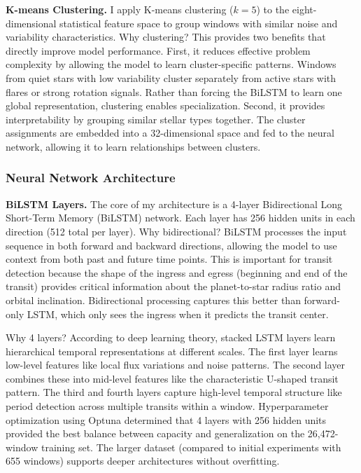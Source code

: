 \documentclass[letterpaper]{article} %
\begin{document}
\textbf{K-means Clustering.} I apply K-means clustering ($k=5$) to the eight-dimensional statistical feature space to group windows with similar noise and variability characteristics. Why clustering? This provides two benefits that directly improve model performance. First, it reduces effective problem complexity by allowing the model to learn cluster-specific patterns. Windows from quiet stars with low variability cluster separately from active stars with flares or strong rotation signals. Rather than forcing the BiLSTM to learn one global representation, clustering enables specialization. Second, it provides interpretability by grouping similar stellar types together. The cluster assignments are embedded into a 32-dimensional space and fed to the neural network, allowing it to learn relationships between clusters.

\subsubsection{Neural Network Architecture}
\textbf{BiLSTM Layers.} The core of my architecture is a 4-layer Bidirectional Long Short-Term Memory (BiLSTM) network. Each layer has 256 hidden units in each direction (512 total per layer). Why bidirectional? BiLSTM processes the input sequence in both forward and backward directions, allowing the model to use context from both past and future time points. This is important for transit detection because the shape of the ingress and egress (beginning and end of the transit) provides critical information about the planet-to-star radius ratio and orbital inclination. Bidirectional processing captures this better than forward-only LSTM, which only sees the ingress when it predicts the transit center.

Why 4 layers? According to deep learning theory, stacked LSTM layers learn hierarchical temporal representations at different scales. The first layer learns low-level features like local flux variations and noise patterns. The second layer combines these into mid-level features like the characteristic U-shaped transit pattern. The third and fourth layers capture high-level temporal structure like period detection across multiple transits within a window. Hyperparameter optimization using Optuna determined that 4 layers with 256 hidden units provided the best balance between capacity and generalization on the 26,472-window training set. The larger dataset (compared to initial experiments with 655 windows) supports deeper architectures without overfitting.
\end{document}
